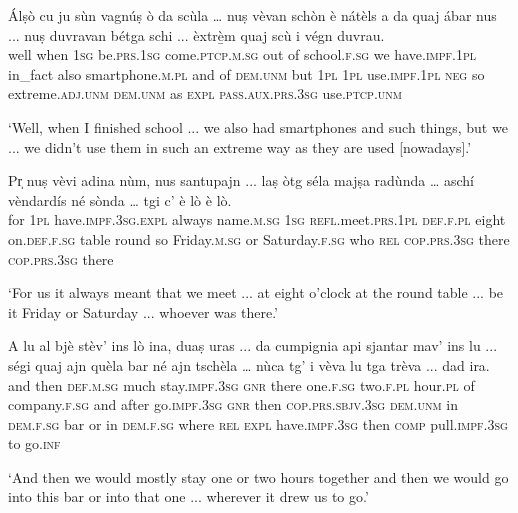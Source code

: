 \begin{linenumbers}
	\gll  Álṣò cu ju sùn vagnúṣ ò da scùla … nuṣ vèvan schòn è nátèls a da quaj ábar nus ... nuṣ duvravan bétga schi ... èxtrè̱m quaj scù i végn duvrau.  \\
well when \textsc{1sg} be.\textsc{prs.1sg} come.\textsc{ptcp.m.sg} out of school.\textsc{f.sg} {} we have.\textsc{impf.1pl} in\_fact also smartphone.\textsc{m.pl} and of \textsc{dem.unm} but \textsc{1pl} {} \textsc{1pl} use.\textsc{impf.1pl} \textsc{neg} so {} extreme.\textsc{adj.unm} \textsc{dem.unm} as \textsc{expl} \textsc{pass.aux.prs.3sg} use.\textsc{ptcp.unm}\\
\end{linenumbers}
\medskip
\glt `Well, when I finished school ... we also had smartphones and such things, but we ... we didn't use them in such an extreme way as they are used [nowadays].'
\medskip

\begin{linenumbers}
	\gll Pr̩ nuṣ vèvi adina nùm, nus santupajn ... laṣ òtg séla majṣa radùnda … aschí vèndardís né sònda … tgi c’ è lò è lò.   \\
for \textsc{1pl} have.\textsc{impf.3sg.expl} always name.\textsc{m.sg} \textsc{1sg} \textsc{refl}.meet.\textsc{prs.1pl} {} \textsc{def.f.pl} eight on.\textsc{def.f.sg} table round {} so Friday.\textsc{m.sg} or Saturday.\textsc{f.sg} {} who \textsc{rel} \textsc{cop.prs.3sg} there \textsc{cop.prs.3sg} there	\\
\end{linenumbers}
\medskip
\glt `For us it always meant that we meet ... at eight o'clock at the round table ... be it Friday or Saturday ... whoever was there.'
\medskip

\begin{linenumbers}
	\gll  A lu al bjè stèv’ ins lò ina, duaṣ uras ... da cumpignia api sjantar mav’ ins lu ... ségi quaj ajn quèla bar né ajn tschèla … nùca tg’ i vèva lu tga trèva ... dad ira.  \\
	and then \textsc{def.m.sg} much stay.\textsc{impf.3sg} \textsc{gnr} there one.\textsc{f.sg} two.\textsc{f.pl} hour.\textsc{pl} {} of company.\textsc{f.sg} and after go.\textsc{impf.3sg} \textsc{gnr} then {} \textsc{cop.prs.sbjv.3sg} \textsc{dem.unm} in \textsc{dem.f.sg} bar or in \textsc{dem.f.sg} {} where \textsc{rel} \textsc{expl} have.\textsc{impf.3sg} then \textsc{comp} pull.\textsc{impf.3sg} {} to go.\textsc{inf}\\
\end{linenumbers}
\medskip
\glt `And then we would mostly stay one or two hours together and then we would go into this bar or into that one ... wherever it drew us to go.'
\medskip

